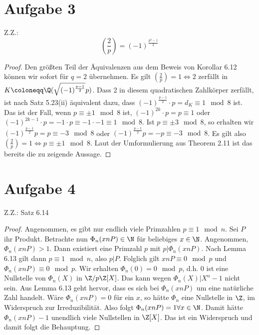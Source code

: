 \documentclass{article}
\begin{document}
\begin{enumerate}[(a)]
\section*{Aufgabe 3}
    Z.Z.: $$\left(\frac{2}{p}\right) = (-1)^{\frac{p^2-1}{2}}$$
    \begin{proof}
        Den größten Teil der Äquivalenzen aus dem Beweis von Korollar 6.12 können wir sofort für $q = 2$ übernehmen.
        Es gilt $\left(\frac{2}{p}\right) = 1  \Leftrightarrow 2 $ zerfällt in $K \coloneqq \Q(\sqrt{(-1)^{\frac{p-1}{2}}}p)$.
        Dass 2 in diesem quadratischen Zahlkörper zerfällt, ist nach Satz 5.23(ii) äquivalent dazu, dass
        $(-1)^{\frac{p-1}{2}}\cdot p = d_K \equiv 1 \mod 8$ ist.
        Das ist der Fall, wenn $p \equiv \pm 1 \mod 8$ ist, $(-1)^{2k} \cdot p = p \equiv 1$ oder $(-1)^{2k-1} \cdot p = -1 \cdot p \equiv -1 \cdot -1 \equiv 1 \mod 8$.
        Ist $p \equiv \pm 3 \mod 8$, so erhalten wir $(-1)^{\frac{p-1}{2}}p = p \equiv -3 \mod 8$ oder $(-1)^{\frac{p-1}{2}}p = -p \equiv -3 \mod 8$.
        Es gilt also $\left(\frac{2}{p}\right) = 1 \Leftrightarrow p \equiv \pm 1 \mod 8$.
        Laut der Umformulierung aus Theorem 2.11 ist das bereits die zu zeigende Aussage.
    \end{proof}
\section*{Aufgabe 4}
    Z.Z.: Satz 6.14
    \begin{proof}
        Angenommen, es gibt nur endlich viele Primzahlen $p \equiv 1 \mod n$. Sei $P$ ihr Produkt.
        Betrachte nun $\Phi_n(xnP) \in \N$ für beliebiges $x\in \N$. Angenommen, $\Phi_n(xnP) > 1$. 
        Dann existiert eine Primzahl $p$ mit $p | \Phi_n(xnP)$. Nach Lemma 6.13 gilt dann $p \equiv 1 \mod n$, also $p | P$.
        Folglich gilt $xnP \equiv 0 \mod p$ und $\Phi_n(xnP) \equiv 0 \mod p$. Wir erhalten $\Phi_n(0) = 0 \mod p$, d.h.
        $0$ ist eine Nullstelle von $\Phi_n(X)$ in $\Z/p\Z[X]$. Das kann wegen $\Phi_n(X) | X^n -1$ nicht sein.
        Aus Lemma 6.13 geht hervor, dass es sich bei $\Phi_n(xnP)$ um eine natürliche Zahl handelt.
        Wäre $\Phi_n(xnP) = 0$ für ein $x$, so hätte $\Phi_n$ eine Nullstelle in $\Z$, im Widerspruch zur Irreduzibilität.
        Also folgt $\Phi_n(xnP) = 1 \forall x\in \N$. Damit hätte $\Phi_n(xnP) - 1$ unendlich viele Nullstellen in $\Z[X]$.
        Das ist ein Widerspruch und damit folgt die Behauptung.
    \end{proof}
\end{enumerate}
\end{document}
